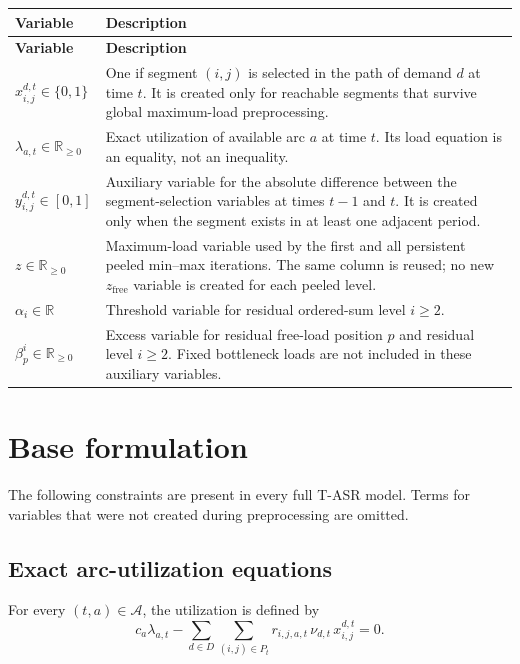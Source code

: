 \documentclass[11pt,a4paper]{article}
\newcommand{\R}{\mathbb{R}}
\newcommand{\Acal}{\mathcal{A}}
\begin{document}
\begin{longtable}{
    >{\raggedright\arraybackslash}p{}
    >{\raggedright\arraybackslash}p{}
}
\toprule
\textbf{Variable} & \textbf{Description} \\
\midrule
\endfirsthead
\toprule
\textbf{Variable} & \textbf{Description} \\
\midrule
\endhead

$x_{i,j}^{d,t}\in\{0,1\}$ & One if segment $(i,j)$ is selected in the path of demand $d$ at time $t$. It is created only for reachable segments that survive global maximum-load preprocessing. \\[0.4em]
$\lambda_{a,t}\in\R_{\geq0}$ & Exact utilization of available arc $a$ at time $t$. Its load equation is an equality, not an inequality. \\[0.4em]
$y_{i,j}^{d,t}\in[0,1]$ & Auxiliary variable for the absolute difference between the segment-selection variables at times $t-1$ and $t$. It is created only when the segment exists in at least one adjacent period. \\[0.4em]
$z\in\R_{\geq0}$ & Maximum-load variable used by the first and all persistent peeled min--max iterations. The same column is reused; no new $z_{\mathrm{free}}$ variable is created for each peeled level. \\[0.4em]
$\alpha_i\in\R$ & Threshold variable for residual ordered-sum level $i\geq2$. \\[0.4em]
$\beta_p^i\in\R_{\geq0}$ & Excess variable for residual free-load position $p$ and residual level $i\geq2$. Fixed bottleneck loads are not included in these auxiliary variables. \\
\bottomrule
\end{longtable}

\section{Base formulation}

The following constraints are present in every full T-ASR model. Terms for
variables that were not created during preprocessing are omitted.

\subsection{Exact arc-utilization equations}

For every $(t,a)\in\Acal$, the utilization is defined by
\begin{equation}
 c_a\lambda_{a,t}
 -\sum_{d\in D}\sum_{(i,j)\in P_t}
 r_{i,j,a,t}\,\nu_{d,t}\,x_{i,j}^{d,t}=0.
\tag{1}
\end{equation}
\end{document}
